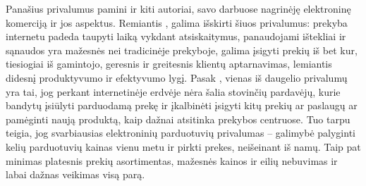 \documentclass[12pt, titlepage]{article}
\begin{document}
\medskip
\par
Panašius privalumus pamini ir kiti autoriai, savo darbuose nagrinėję elektroninę komerciją ir jos aspektus. Remiantis \textcite{dambrauskaite2014elektronines}, galima išskirti šiuos privalumus: prekyba internetu padeda taupyti laiką vykdant atsiskaitymus, panaudojami ištekliai ir sąnaudos yra mažesnės nei tradicinėje prekyboje, galima įsigyti prekių iš bet kur, tiesiogiai iš gamintojo, geresnis ir greitesnis klientų aptarnavimas, lemiantis didesnį produktyvumo ir efektyvumo lygį. Pasak \textcite{bernotavivciute2013produktku}, vienas iš daugelio privalumų yra tai, jog perkant internetinėje erdvėje nėra šalia stovinčių pardavėjų, kurie bandytų įsiūlyti parduodamą prekę ir įkalbinėti įsigyti kitų prekių ar paslaugų ar pamėginti naują produktą, kaip dažnai atsitinka prekybos centruose.
Tuo tarpu \textcite{jurgelionyte2010elektronines} teigia, jog svarbiausias elektroninių parduotuvių privalumas – galimybė palyginti kelių parduotuvių kainas vienu metu ir pirkti prekes, neišeinant iš namų.  Taip pat minimas platesnis prekių asortimentas, mažesnės kainos ir eilių nebuvimas ir labai dažnas veikimas visą parą.
\medskip
\end{document}
